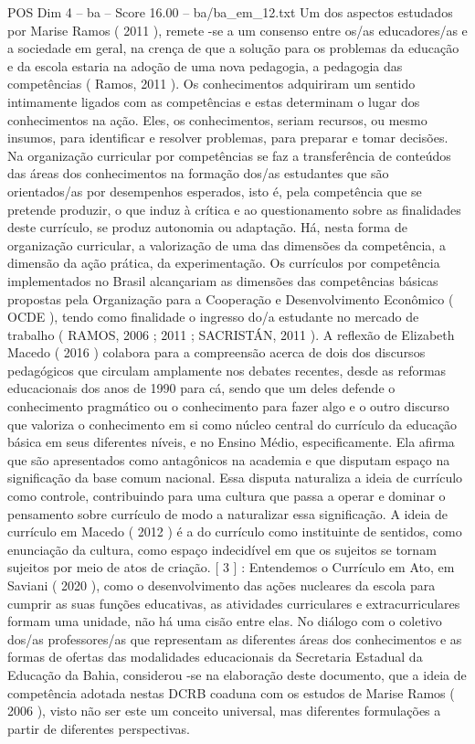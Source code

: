 \begin{textsample}{POS Dim 4 – ba – Score 16.00 – ba/ba\_em\_12.txt}
Um dos aspectos estudados por Marise Ramos ( 2011 ), remete -se a um consenso entre os/as educadores/as e a sociedade em geral, na crença de que a solução para os problemas da educação e da escola estaria na adoção de uma nova pedagogia, a pedagogia das competências ( Ramos, 2011 ).
Os conhecimentos adquiriram um sentido intimamente ligados com as competências e estas determinam o lugar dos conhecimentos na ação.
Eles, os conhecimentos, seriam recursos, ou mesmo insumos, para identificar e resolver problemas, para preparar e tomar decisões.
Na organização curricular por competências se faz a transferência de conteúdos das áreas dos conhecimentos na formação dos/as estudantes que são orientados/as por desempenhos esperados, isto é, pela competência que se pretende produzir, o que induz à crítica e ao questionamento sobre as finalidades deste currículo, se produz autonomia ou adaptação.
Há, nesta forma de organização curricular, a valorização de uma das dimensões da competência, a dimensão da ação prática, da experimentação.
Os currículos por competência implementados no Brasil alcançariam as dimensões das competências básicas propostas pela Organização para a Cooperação e Desenvolvimento Econômico ( OCDE ), tendo como finalidade o ingresso do/a estudante no mercado de trabalho ( RAMOS, 2006 ; 2011 ; SACRISTÁN, 2011 ).
A reflexão de Elizabeth Macedo ( 2016 ) colabora para a compreensão acerca de dois dos discursos pedagógicos que circulam amplamente nos debates recentes, desde as reformas educacionais dos anos de 1990 para cá, sendo que um deles defende o conhecimento pragmático ou o conhecimento para fazer algo e o outro discurso que valoriza o conhecimento em si como núcleo central do currículo da educação básica em seus diferentes níveis, e no Ensino Médio, especificamente.
Ela afirma que são apresentados como antagônicos na academia e que disputam espaço na significação da base comum nacional.
Essa disputa naturaliza a ideia de currículo como controle, contribuindo para uma cultura que passa a operar e dominar o pensamento sobre currículo de modo a naturalizar essa significação.
A ideia de currículo em Macedo ( 2012 ) é a do currículo como instituinte de sentidos, como enunciação da cultura, como espaço indecidível em que os sujeitos se tornam sujeitos por meio de atos de criação. [ 3 ] : Entendemos o Currículo em Ato, em Saviani ( 2020 ), como o desenvolvimento das ações nucleares da escola para cumprir as suas funções educativas, as atividades curriculares e extracurriculares formam uma unidade, não há uma cisão entre elas.
No diálogo com o coletivo dos/as professores/as que representam as diferentes áreas dos conhecimentos e as formas de ofertas das modalidades educacionais da Secretaria Estadual da Educação da Bahia, considerou -se na elaboração deste documento, que a ideia de competência adotada nestas DCRB coaduna com os estudos de Marise Ramos ( 2006 ), visto não ser este um conceito universal, mas diferentes formulações a partir de diferentes perspectivas.

\end{textsample}
